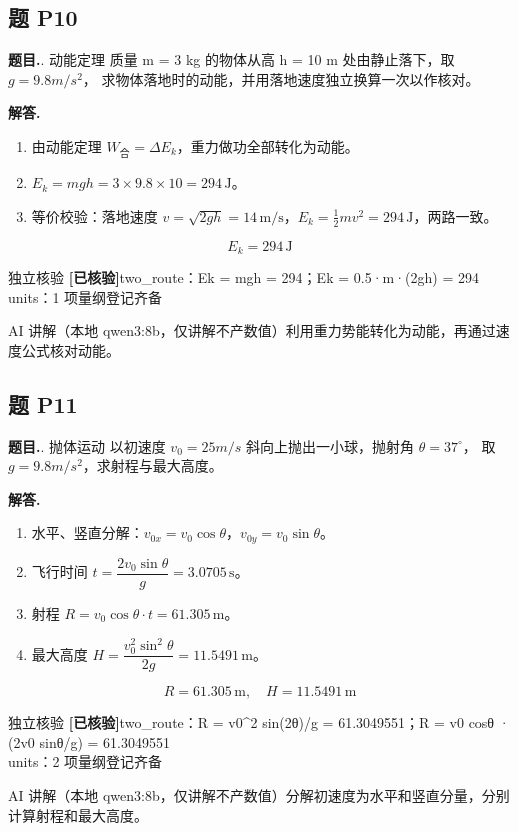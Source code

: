 \documentclass[11pt]{article}
\newcommand{\okmark}{\textcolor{okgreen}{\textbf{[已核验]}}}
\begin{document}
\subsection*{题 P10}
\noindent\textbf{题目.}. 动能定理
质量 m = 3 kg 的物体从高 h = 10 m 处由静止落下，取 $g = 9.8 m/s^2$，
求物体落地时的动能，并用落地速度独立换算一次以作核对。\par
\vspace{4pt}\noindent\textbf{解答.}\quad
\begin{enumerate}[leftmargin=1.6em,itemsep=2pt]
  \item 由动能定理 $W_{\text{合}}=\Delta E_k$，重力做功全部转化为动能。
  \item $E_k=mgh=3\times9.8\times10=294\,\mathrm{J}$。
  \item 等价校验：落地速度 $v=\sqrt{2gh}=14\,\mathrm{m/s}$，$E_k=\tfrac12 m v^2=294\,\mathrm{J}$，两路一致。
\end{enumerate}
\[ \boxed{E_k=294\,\mathrm{J}} \]
\par
\begin{veribox}{独立核验 \okmark}two\_route：Ek = mgh = 294；Ek = 0.5·m·(2gh) = 294\\units：1 项量纲登记齐备\end{veribox}
\begin{aibox}{AI 讲解（本地 qwen3:8b，仅讲解不产数值）}利用重力势能转化为动能，再通过速度公式核对动能。\end{aibox}
\vspace{10pt}
\subsection*{题 P11}
\noindent\textbf{题目.}. 抛体运动
以初速度 $v_0 = 25 m/s$ 斜向上抛出一小球，抛射角 $\theta = 37^\circ$，
取 $g = 9.8 m/s^2$，求射程与最大高度。\par
\vspace{4pt}\noindent\textbf{解答.}\quad
\begin{enumerate}[leftmargin=1.6em,itemsep=2pt]
  \item 水平、竖直分解：$v_{0x}=v_0\cos\theta$，$v_{0y}=v_0\sin\theta$。
  \item 飞行时间 $t=\dfrac{2v_0\sin\theta}{g}=3.0705\,\mathrm{s}$。
  \item 射程 $R=v_0\cos\theta\cdot t=61.305\,\mathrm{m}$。
  \item 最大高度 $H=\dfrac{v_0^2\sin^2\theta}{2g}=11.5491\,\mathrm{m}$。
\end{enumerate}
\[ \boxed{R=61.305\,\mathrm{m},\quad H=11.5491\,\mathrm{m}} \]
\par
\begin{veribox}{独立核验 \okmark}two\_route：R = v0\textasciicircum{}2 sin(2θ)/g = 61.3049551；R = v0 cosθ · (2v0 sinθ/g) = 61.3049551\\units：2 项量纲登记齐备\end{veribox}
\begin{aibox}{AI 讲解（本地 qwen3:8b，仅讲解不产数值）}分解初速度为水平和竖直分量，分别计算射程和最大高度。\end{aibox}
\vspace{10pt}
\end{document}
